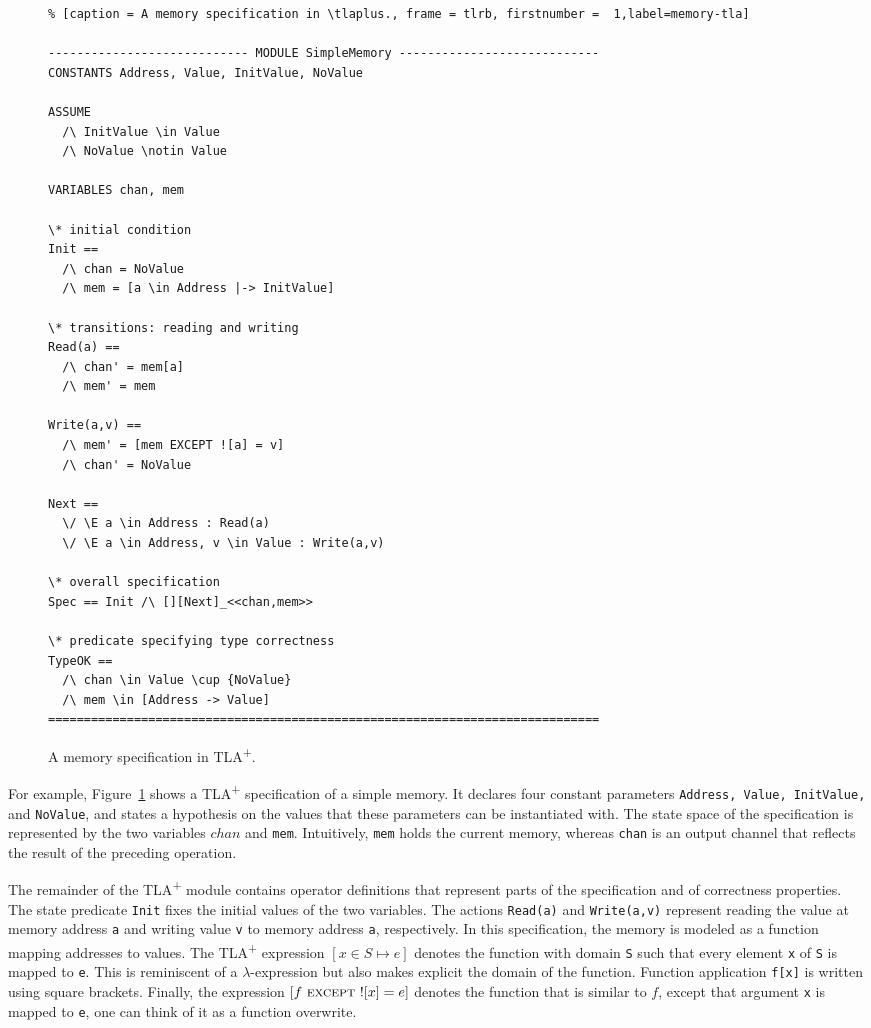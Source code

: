 \documentclass{thesul}
\newcommand{\tlaplus}{TLA\textsuperscript{+}\xspace}
\newcommand{\EXCEPT}{\textsc{except}}
\begin{document}
\begin{figure}
\begin{lstlisting}% [caption = A memory specification in \tlaplus., frame = tlrb, firstnumber =  1,label=memory-tla]

---------------------------- MODULE SimpleMemory ----------------------------
CONSTANTS Address, Value, InitValue, NoValue

ASSUME 
  /\ InitValue \in Value
  /\ NoValue \notin Value

VARIABLES chan, mem

\* initial condition
Init == 
  /\ chan = NoValue
  /\ mem = [a \in Address |-> InitValue]

\* transitions: reading and writing
Read(a) == 
  /\ chan' = mem[a]
  /\ mem' = mem

Write(a,v) ==
  /\ mem' = [mem EXCEPT ![a] = v]
  /\ chan' = NoValue

Next ==
  \/ \E a \in Address : Read(a)
  \/ \E a \in Address, v \in Value : Write(a,v)

\* overall specification
Spec == Init /\ [][Next]_<<chan,mem>>

\* predicate specifying type correctness
TypeOK == 
  /\ chan \in Value \cup {NoValue}
  /\ mem \in [Address -> Value] 
=============================================================================
\end{lstlisting}
\caption{A memory specification in \tlaplus.}
\label{memory-tla}
\end{figure}

For example, Figure~\ref{memory-tla} shows a \tlaplus specification of a simple memory. It declares four constant parameters \verb|Address, Value, InitValue,| and \verb|NoValue|, and states a hypothesis on the values that these parameters can be instantiated with. The state space of the specification is represented by the two variables $chan$ and \verb|mem|. Intuitively, \verb|mem| holds the current memory, whereas \verb|chan| is an output channel that reflects the result of the preceding operation.

The remainder of the \tlaplus module contains operator definitions that represent parts of the specification and of correctness properties. The state predicate \verb|Init| fixes the initial values of the two variables. The actions \verb|Read(a)| and \verb|Write(a,v)| represent reading the value at memory address \verb|a| and writing value \verb|v| to memory address \verb|a|, respectively. In this specification, the memory is modeled as a function mapping addresses to values. The \tlaplus expression $[x \in S \mapsto e]$ denotes the function with domain \verb|S| such that every element \verb|x| of \verb|S| is mapped to \verb|e|. This is reminiscent of a $\lambda$-expression but also makes explicit the domain of the function. Function application \verb|f[x]| is written using square brackets. Finally, the expression $[f\ \EXCEPT\ ![x] = e]$ denotes the function that is similar to $f$, except that argument \verb|x| is mapped to \verb|e|, one can think of it as a function overwrite.
\end{document}
